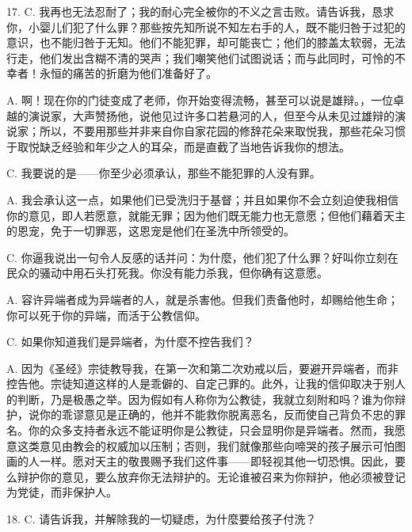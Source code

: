 17. C. 我再也无法忍耐了；我的耐心完全被你的不义之言击败。请告诉我，恳求你，小婴儿们犯了什么罪？那些按先知所说不知左右手的人，既不能归咎于过犯的意识，也不能归咎于无知。他们不能犯罪，却可能丧亡；他们的膝盖太软弱，无法行走，他们发出含糊不清的哭声；我们嘲笑他们试图说话；而与此同时，可怜的不幸者！永恒的痛苦的折磨为他们准备好了。\par

A. 啊！现在你的门徒变成了老师，你开始变得流畅，甚至可以说是雄辩。，一位卓越的演说家，大声赞扬他，说他见过许多口若悬河的人，但至今从未见过雄辩的演说家；所以，不要用那些并非来自你自家花园的修辞花朵来取悦我，那些花朵习惯于取悦缺乏经验和年少之人的耳朵，而是直截了当地告诉我你的想法。\par

C. 我要说的是——你至少必须承认，那些不能犯罪的人没有罪。\par

A. 我会承认这一点，如果他们已受洗归于基督；并且如果你不会立刻迫使我相信你的意见，即人若愿意，就能无罪；因为他们既无能力也无意愿；但他们藉着天主的恩宠，免于一切罪恶，这恩宠是他们在圣洗中所领受的。\par

C. 你逼我说出一句令人反感的话并问：为什麼，他们犯了什么罪？好叫你立刻在民众的骚动中用石头打死我。你没有能力杀我，但你确有这意愿。\par

A. 容许异端者成为异端者的人，就是杀害他。但我们责备他时，却赐给他生命；你可以死于你的异端，而活于公教信仰。\par

C. 如果你知道我们是异端者，为什麼不控告我们？\par

A. 因为《圣经》宗徒教导我，在第一次和第二次劝戒以后，要避开异端者，而非控告他。宗徒知道这样的人是乖僻的、自定己罪的。此外，让我的信仰取决于别人的判断，乃是极愚之举。因为假如有人称你为公教徒，我就立刻附和吗？谁为你辩护，说你的乖谬意见是正确的，他并不能救你脱离恶名，反而使自己背负不忠的罪名。你的众多支持者永远不能证明你是公教徒，只会显明你是异端者。然而，我愿意这类意见由教会的权威加以压制；否则，我们就像那些向啼哭的孩子展示可怕图画的人一样。愿对天主的敬畏赐予我们这件事——即轻视其他一切恐惧。因此，要么辩护你的意见，要么放弃你无法辩护的。无论谁被召来为你辩护，他必须被登记为党徒，而非保护人。\par

18. C. 请告诉我，并解除我的一切疑虑，为什麼要给孩子付洗？\par


